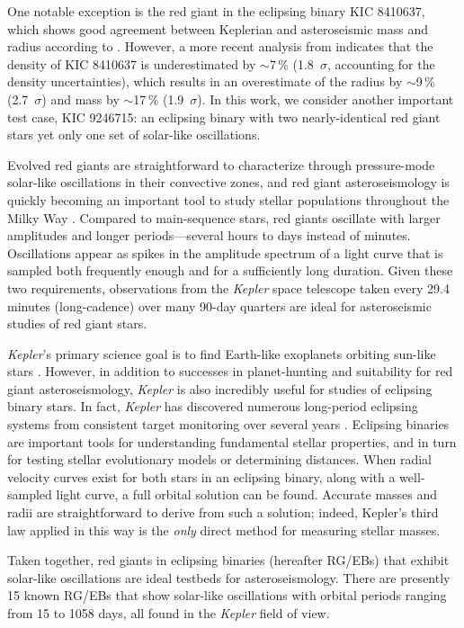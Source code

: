  One notable exception is the red giant in the eclipsing binary KIC 8410637, which shows good agreement between Keplerian and asteroseismic mass and radius according to \citet{fra13}. However, a more recent analysis from \citet{hub14} indicates that the density of KIC 8410637 is underestimated by $\sim$7\,\% (1.8~$\sigma$, accounting for the density uncertainties), which results in an overestimate of the radius by $\sim$9\,\% (2.7~$\sigma$) and mass by $\sim$17\,\% (1.9~$\sigma$). In this work, we consider another important test case, KIC 9246715: an eclipsing binary with two nearly-identical red giant stars yet only one set of solar-like oscillations.

Evolved red giants are straightforward to characterize through pressure-mode solar-like oscillations in their convective zones, and red giant asteroseismology is quickly becoming an important tool to study stellar populations throughout the Milky Way \citep[for a review of this topic, see][]{cha13}. Compared to main-sequence stars, red giants oscillate with larger amplitudes and longer periods---several hours to days instead of minutes. Oscillations appear as spikes in the amplitude spectrum of a light curve that is sampled both frequently enough and for a sufficiently long duration. Given these two requirements, observations from the \emph{Kepler} space telescope taken every 29.4 minutes (long-cadence) over many 90-day quarters are ideal for asteroseismic studies of red giant stars.

\emph{Kepler}'s primary science goal is to find Earth-like exoplanets orbiting sun-like stars \citep{bor10}. However, in addition to successes in planet-hunting and suitability for red giant asteroseismology, \emph{Kepler} is also incredibly useful for studies of eclipsing binary stars. In fact, \emph{Kepler} has discovered numerous long-period eclipsing systems from consistent target monitoring over several years \citep{prs11,sla11}. Eclipsing binaries are important tools for understanding fundamental stellar properties, and in turn for testing stellar evolutionary models or determining distances. When radial velocity curves exist for both stars in an eclipsing binary, along with a well-sampled light curve, a full orbital solution can be found. Accurate masses and radii are straightforward to derive from such a solution; indeed, Kepler's third law applied in this way is the \emph{only} direct method for measuring stellar masses.

Taken together, red giants in eclipsing binaries (hereafter RG/EBs) that exhibit solar-like oscillations are ideal testbeds for asteroseismology. There are presently 15 known RG/EBs that show solar-like oscillations \citep{hek10,gau13,gau14} with orbital periods ranging from 15 to 1058 days, all found in the \emph{Kepler} field of view.


